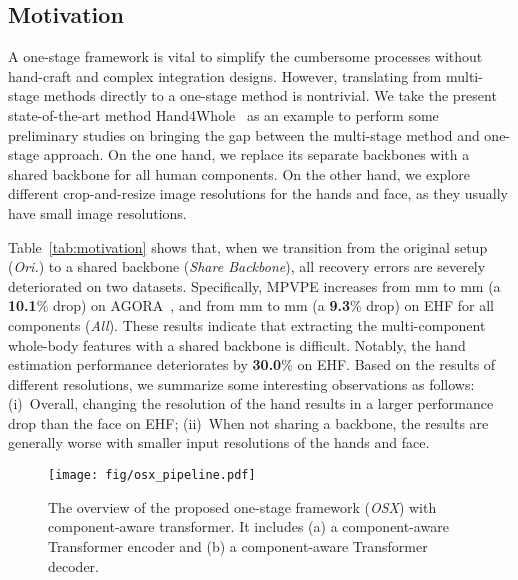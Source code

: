 \documentclass[10pt,twocolumn,letterpaper]{article}
\newcommand{\modelname}{\emph{OSX}\xspace}
\begin{document}
\subsection{Motivation}
\label{sec:motivate}

A one-stage framework is vital to simplify the cumbersome processes without hand-craft and complex integration designs. 
However, translating from multi-stage methods directly to a one-stage method is nontrivial.
We take the present state-of-the-art method Hand4Whole~\cite{GyeongsikMoon2020hand4whole} as an example to perform some preliminary studies on bringing the gap between the multi-stage method and one-stage approach. 
On the one hand, we replace its separate backbones with a shared backbone for all human components. On the other hand, we explore different crop-and-resize image resolutions for the hands and face, as they usually have small image resolutions.


Table~\ref{tab:motivation} shows that, when we transition from the original setup (\emph{Ori.}) to a shared backbone (\emph{Share Backbone}), all recovery errors are severely deteriorated on two datasets. Specifically, MPVPE increases from mm to mm (a \textbf{10.1}\% drop) on AGORA~\cite{Patel_2021agora}, and from mm to mm (a \textbf{9.3}\% drop) on EHF for all components (\emph{All}). 
These results indicate that extracting the multi-component whole-body features with a shared backbone is difficult. Notably, the hand estimation performance deteriorates by
\textbf{30.0}\% on EHF.
Based on the results of different resolutions, we summarize some interesting observations as follows: 
(i)~Overall, changing the resolution of the hand results in a larger performance drop than the face on EHF;
(ii)~When not sharing a backbone, the results are generally worse with smaller input resolutions of the hands and face.



\begin{figure*}[t]
\begin{center}
\texttt{[image: fig/osx\_pipeline.pdf]}
\end{center}
\vspace{-0.4cm}
\caption{
The overview of the proposed one-stage framework (\modelname) with component-aware transformer. It includes (a) a component-aware Transformer encoder and (b) a component-aware Transformer decoder.
}
\label{fig:method}
\vspace{-0.4cm}
\end{figure*}
\end{document}
